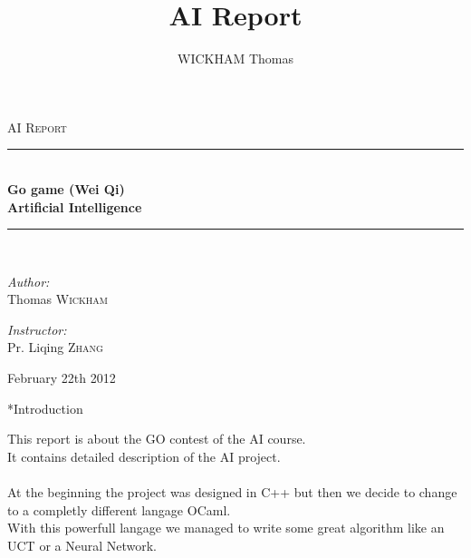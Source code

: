 \documentclass[12pt,a4paper,titlepage]{book}
\author{WICKHAM Thomas}
\title{AI Report}
\makeatletter
\newcommand{\HRule}{\rule{\linewidth}{0.5mm}}
\renewcommand\chapter{\clearpage\@startsection{chapter}{0}{1em}{\baselineskip}{2\baselineskip}{\Huge\textbf}}
\makeatother
\begin{document}
\begin{titlepage}

\begin{center}
\textsc{\LARGE AI Report}\\[0.5cm]


\HRule \\[1.0cm]
{\Huge \bfseries Go game (Wei Qi)\\[2ex]
Artificial Intelligence}\\[1.0cm]

\HRule \\[2.0cm]

\begin{minipage}{0.4\textwidth}
\begin{flushleft} \large
\emph{Author:}\\
Thomas \textsc{Wickham}
\end{flushleft}
\end{minipage}
\begin{minipage}{0.4\textwidth}
\begin{flushright} \large
\emph{Instructor:} \\
Pr. Liqing \textsc{Zhang}
\end{flushright}
\end{minipage}

\vfill

{\large February 22th 2012}

\end{center}

\end{titlepage}

\newpage


\tableofcontents

\chapter*{Introduction}

This report is about the GO contest of the AI course.\\
It contains detailed description of the AI project.\\
\\
At the beginning the project was designed in C++ but then we decide to change to
a completly different langage OCaml.\\
With this powerfull langage we managed to write some great algorithm like an UCT
or a Neural Network.\\
\end{document}
